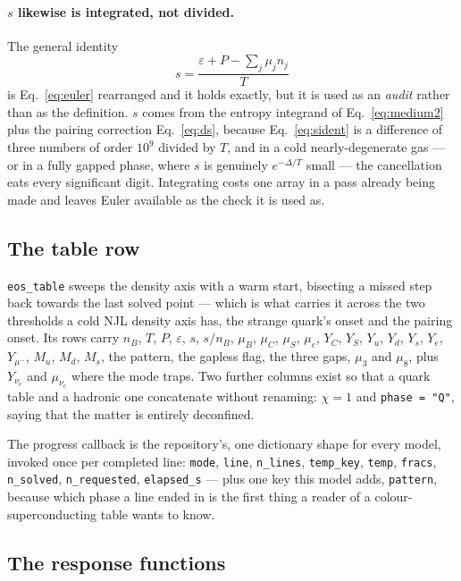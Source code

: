 \documentclass[aps,prc,onecolumn,superscriptaddress,nofootinbib,10pt]{revtex4-2}
\newcommand{\nB}{n_B}
\newcommand{\muB}{\mu_B}
\newcommand{\muC}{\mu_C}
\newcommand{\muS}{\mu_S}
\begin{document}
\paragraph{$s$ likewise is integrated, not divided.} The general identity
\begin{equation}
  s = \frac{\varepsilon + P - \sum_j \mu_j n_j}{T}
  \label{eq:sident}
\end{equation}
is Eq.~\eqref{eq:euler} rearranged and it holds exactly, but it is used as an
\emph{audit} rather than as the definition. $s$ comes from the entropy
integrand of Eq.~\eqref{eq:medium2} plus the pairing correction
Eq.~\eqref{eq:ds}, because Eq.~\eqref{eq:sident} is a difference of three
numbers of order $10^9$ divided by $T$, and in a cold nearly-degenerate gas ---
or in a fully gapped phase, where $s$ is genuinely $e^{-\Delta/T}$ small ---
the cancellation eats every significant digit. Integrating costs one array in
a pass already being made and leaves Euler available as the check it is used as.

\subsection{The table row}
\label{sec:tablerow}

\texttt{eos\_table} sweeps the density axis with a warm start, bisecting a
missed step back towards the last solved point --- which is what carries it
across the two thresholds a cold NJL density axis has, the strange quark's
onset and the pairing onset. Its rows carry
$\nB$, $T$, $P$, $\varepsilon$, $s$, $s/\nB$, $\muB$, $\muC$, $\muS$, $\mu_e$,
$Y_C$, $Y_S$, $Y_u$, $Y_d$, $Y_s$, $Y_e$, $Y_{\mu^-}$, $M_u$, $M_d$, $M_s$, the
pattern, the gapless flag, the three gaps, $\mu_3$ and $\mu_8$, plus
$Y_{\nu_e}$ and $\mu_{\nu_e}$ where the mode traps. Two further columns exist
so that a quark table and a hadronic one concatenate without renaming:
$\chi = 1$ and \texttt{phase = "Q"}, saying that the matter is entirely
deconfined.

The progress callback is the repository's, one dictionary shape for every
model, invoked once per completed line: \texttt{mode}, \texttt{line},
\texttt{n\_lines}, \texttt{temp\_key}, \texttt{temp}, \texttt{fracs},
\texttt{n\_solved}, \texttt{n\_requested}, \texttt{elapsed\_s} --- plus one key
this model adds, \texttt{pattern}, because which phase a line ended in is the
first thing a reader of a colour-superconducting table wants to know.

\subsection{The response functions}
\label{sec:responses}
\end{document}
